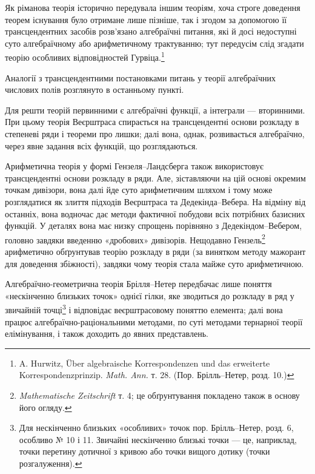\documentclass[11pt]{article}
\begin{document}
Як ріманова теорія історично передувала іншим теоріям, хоча строге доведення теорем існування було отримане лише пізніше, так і згодом за допомогою її трансцендентних засобів розв'язано алгебраїчні питання, які й досі недоступні суто алгебраїчному або арифметичному трактуванню; тут передусім слід згадати теорію особливих відповідностей Гурвіца.\footnote{A. Hurwitz, Über algebraische Korrespondenzen und das erweiterte Korrespondenzprinzip. \emph{Math. Ann.} т. 28. (Пор. Брілль--Нетер, розд. 10.)}

Аналогії з трансцендентними постановками питань у теорії алгебраїчних числових полів розглянуто в останньому пункті.

Для решти теорій первинними є алгебраїчні функції, а інтеграли --- вторинними. При цьому теорія Веєрштраса спирається на трансцендентні основи розкладу в степеневі ряди і теореми про лишки; далі вона, однак, розвивається алгебраїчно, через явне задання всіх функцій, що розглядаються.

Арифметична теорія у формі Гензеля--Ландсберга також використовує трансцендентні основи розкладу в ряди. Але, зіставляючи на цій основі окремим точкам дивізори, вона далі йде суто арифметичним шляхом і тому може розглядатися як злиття підходів Веєрштраса та Дедекінда--Вебера. На відміну від останніх, вона водночас дає методи фактичної побудови всіх потрібних базисних функцій. У деталях вона має низку спрощень порівняно з Дедекіндом--Вебером, головно завдяки введенню «дробових» дивізорів. Нещодавно Гензель\footnote{\emph{Mathematische Zeitschrift} т. 4; це обґрунтування покладено також в основу його огляду.} арифметично обґрунтував теорію розкладу в ряди (за винятком методу мажорант для доведення збіжності), завдяки чому теорія стала майже суто арифметичною.

Алгебраїчно-геометрична теорія Брілля--Нетер передбачає лише поняття «нескінченно близьких точок» однієї гілки, яке зводиться до розкладу в ряд у звичайній точці\footnote{Для нескінченно близьких «особливих» точок пор. Брілль--Нетер, розд. 6, особливо № 10 і 11. Звичайні нескінченно близькі точки --- це, наприклад, точки перетину дотичної з кривою або точки вищого дотику (точки розгалуження).} і відповідає веєрштрасовому поняттю елемента; далі вона працює алгебраїчно-раціональними методами, по суті методами тернарної теорії елімінування, і також доходить до явних представлень.
\end{document}
